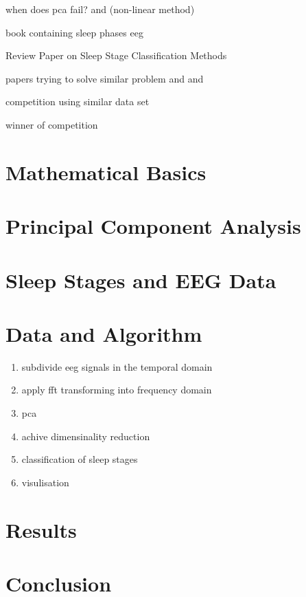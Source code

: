 \documentclass[a4paper]{IEEEtran}
\begin{document}
when does pca fail? \cite{Shlens2014} and \cite{Tenenbaum2000} (non-linear method)

book containing sleep phases eeg \cite{Ganong1997}

Review Paper on Sleep Stage Classification Methods \cite{Boostani2017}

papers trying to solve similar problem \cite{Tautan2021} and \cite{Putilov2015} and \cite{Metzner2023}

competition using similar data set \cite{Ghassemi2018}

winner of competition \cite{Howe2018}

\section{Mathematical Basics}

\section{Principal Component Analysis}

\section{Sleep Stages and EEG Data}

\section{Data and Algorithm}
\begin{enumerate}
	\item subdivide eeg signals in the temporal domain
	\item apply fft transforming into frequency domain
	\item pca
	\item achive dimensinality reduction
	\item classification of sleep stages
	\item visulisation
\end{enumerate}



\section{Results}

\section{Conclusion}




\end{document}
